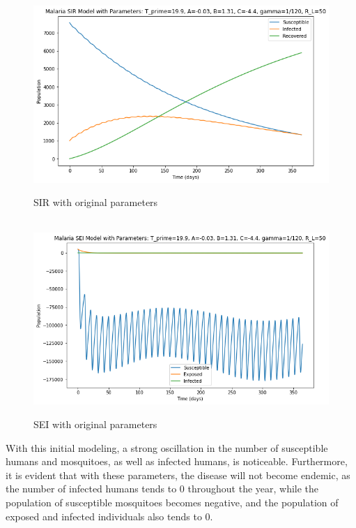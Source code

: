 \begin{figure}[!ht]
        \centering
        \hbox{\hspace{6em} \includegraphics[scale=0.45] {THESIS-SIR_Dados_Originais_Parham_Michael_CORRECAO.png}}
        \caption{SIR with original parameters}
\end{figure} 
\begin{figure}[!ht]
        \centering
        \hbox{\hspace{6em} \includegraphics[scale=0.45] {THESIS-SEI_Dados_Originais_Parham_Michael_CORRECAO.png}}
        \caption{SEI with original parameters}
\end{figure} 
\newpage
With this initial modeling, 
a strong oscillation in the number 
of susceptible humans and mosquitoes, 
as well as infected humans, is noticeable. 
Furthermore, it is evident that with these 
parameters, the disease will not become endemic, 
as the number of infected humans tends to 0 
throughout the year, while the population of 
susceptible mosquitoes becomes negative, and the 
population of exposed and infected individuals also tends to 0. 
